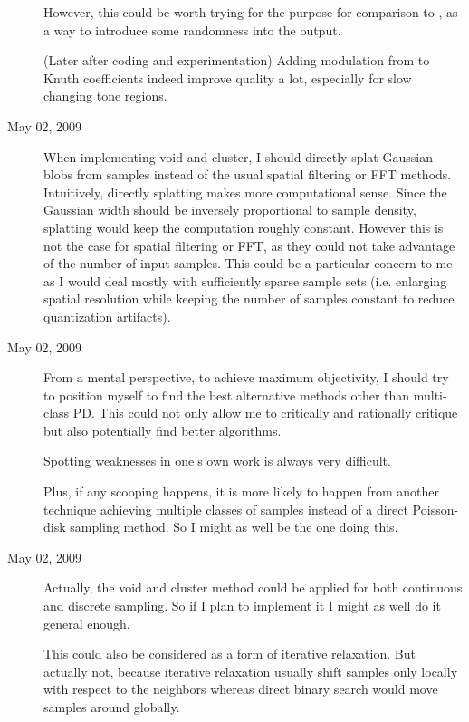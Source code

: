 \begin{description}
{However, this could be worth trying for the purpose for comparison to \cite{Wei:2009:MPDS}, as a way to introduce some randomness into the output.

(Later after coding and experimentation) Adding modulation from \cite{Zhou:2003:IMT} to Knuth coefficients indeed improve quality a lot, especially for slow changing tone regions.
}
\item[May 02, 2009]
{
When implementing void-and-cluster, I should directly splat Gaussian blobs from samples instead of the usual spatial filtering or FFT methods.
Intuitively, directly splatting makes more computational sense. Since the Gaussian width should be inversely proportional to sample density, splatting would keep the computation roughly constant.
However this is not the case for spatial filtering or FFT, as they could not take advantage of the number of input samples.
This could be a particular concern to me as I would deal mostly with sufficiently sparse sample sets (i.e. enlarging spatial resolution while keeping the number of samples constant to reduce quantization artifacts).
}
\item[May 02, 2009]
{
From a mental perspective, to achieve maximum objectivity, I should try to position myself to find the best alternative methods other than multi-class PD.
This could not only allow me to critically and rationally critique \cite{Wei:2009:MPDS} but also potentially find better algorithms.

Spotting weaknesses in one's own work is always very difficult.

Plus, if any scooping happens, it is more likely to happen from another technique achieving multiple classes of samples instead of a direct Poisson-disk sampling method. So I might as well be the one doing this.
}
\item[May 02, 2009]
{
Actually, the void and cluster method could be applied for both continuous and discrete sampling. So if I plan to implement it I might as well do it general enough.

This could also be considered as a form of iterative relaxation.
But actually not, because iterative relaxation usually shift samples only locally with respect to the neighbors whereas direct binary search would move samples around globally.

}
\end{description}
